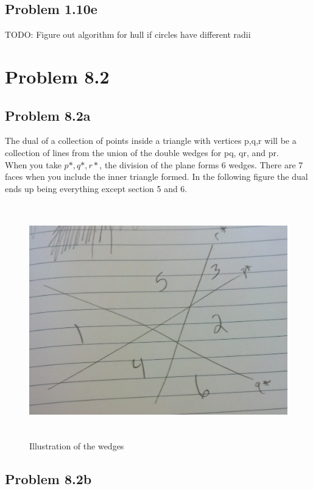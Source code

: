 \documentclass[11pt,psfig]{article}
\begin{document}
\subsection*{Problem 1.10e}

TODO: Figure out algorithm for hull if circles have different radii


\section*{Problem 8.2}

\subsection*{Problem 8.2a}

The dual of a collection of points inside a triangle with vertices p,q,r will be a collection of lines from the union of the double wedges for pq, qr, and pr. 
\\
When you take $p*, q*, r*$, the division of the plane forms 6 wedges. There are 7 faces when you include the inner triangle formed. In the following figure the dual ends up being everything except section 5 and 6.  

\begin{figure}[H]
\centering
\includegraphics[height=4in]{cs266dual.jpg}
\caption{Illustration of the wedges}
\end{figure}

\subsection*{Problem 8.2b}
\end{document}
